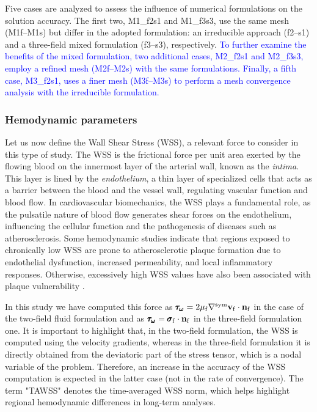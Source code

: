 \documentclass[11pt,english]{article}
\def\viscfluid{\mu_{\rm{f}}}                 %
\def\vfluid{\vb{v}_{\rm{f}}}               %
\def\nfluid{\vb{n}_{\mathrm{f}}}
\def\sigmafluid{\pmb{\sigma}_{\rm{f}}}
\begin{document}
Five cases are analyzed to assess the influence of numerical formulations on the solution accuracy. The first two, M1\_f2s1 and M1\_f3s3, use the same mesh (M1f–M1s) but differ in the adopted formulation: an irreducible approach (f2–s1) and a three-field mixed formulation (f3–s3), respectively. \textcolor{blue}{To further examine the benefits of the mixed formulation, two additional cases, M2\_f2s1 and M2\_f3s3, employ a refined mesh (M2f–M2s) with the same formulations. Finally, a fifth case, M3\_f2s1, uses a finer mesh (M3f–M3s) to perform a mesh convergence analysis with the irreducible formulation.}

\subsubsection{Hemodynamic parameters}

Let us now define the Wall Shear Stress (WSS), a relevant force to consider in this type of study. The WSS is the frictional force per unit area exerted by the flowing blood on the innermost layer of the arterial wall, known as the \textit{intima}. This layer is lined by the \textit{endothelium}, a thin layer of specialized cells that acts as a barrier between the blood and the vessel wall, regulating vascular function and blood flow. 
In cardiovascular biomechanics, the WSS plays a fundamental role, as the pulsatile nature of blood flow generates shear forces on the endothelium, influencing the cellular function and the pathogenesis of diseases such as atherosclerosis.
Some hemodynamic studies indicate that regions exposed to chronically low WSS are prone to atherosclerotic plaque formation due to endothelial dysfunction, increased permeability, and local inflammatory responses. Otherwise, excessively high WSS values have also been associated with plaque vulnerability \cite{malek1999hemodynamic,dolan2013high}. 

In this study we have computed this force as $\pmb{\tau_\omega}=2\viscfluid \nabla^{\text{sym}}\vfluid \cdot \nfluid$ in the case of the two-field fluid formulation and as $\pmb{\tau_\omega}=\sigmafluid \cdot \nfluid$ in the three-field formulation one. It is important to highlight that, in the two-field formulation, the WSS is computed using the velocity gradients, whereas in the three-field formulation it is directly obtained from the deviatoric part of the stress tensor, which is a nodal variable of the problem. Therefore, an increase in the accuracy of the WSS computation is expected in the latter case (not in the rate of convergence). The term "TAWSS" denotes the time-averaged WSS norm, which helps highlight regional hemodynamic differences in long-term analyses.
\end{document}
